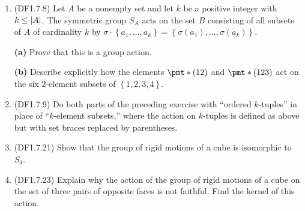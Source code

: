 \documentclass[11pt]{article}
\newcommand{\cbr}[1]{\left\{#1\right\}}
\begin{document}
\begin{enumerate}
    \item (DF1.7.8) Let $A$ be a nonempty set and let $k$ be a positive integer with $k\leq \abs{A}$. The symmetric group $S_A$ acts on the set $B$ consisting of all subsets of $A$ of cardinality $k$ by $\sigma\cdot\cbr{a_1,\dots,a_k} = \cbr{\sigma(a_1),\dots,\sigma(a_k)}$.
    
    \textbf{(a)} Prove that this is a group action. 

    \textbf{(b)} Describe explicitly how the elements $\pmt*{(12)}$ and $\pmt*{(123)}$ act on the six $2$-element subsets of $\cbr{1,2,3,4}$.
    \item (DF1.7.9) Do both parts of the preceding exercise with ``ordered $k$-tuples'' in place of ``$k$-element subsets,'' where the action on $k$-tuples is defined as above but with set braces replaced by parentheses.
    \item (DF1.7.21) Show that the group of rigid motions of a cube is isomorphic to $S_4$.
    \item (DF1.7.23) Explain why the action of the group of rigid motions of a cube on the set of three pairs of opposite faces is not faithful. Find the kernel of this action.
\end{enumerate}
\end{document}
